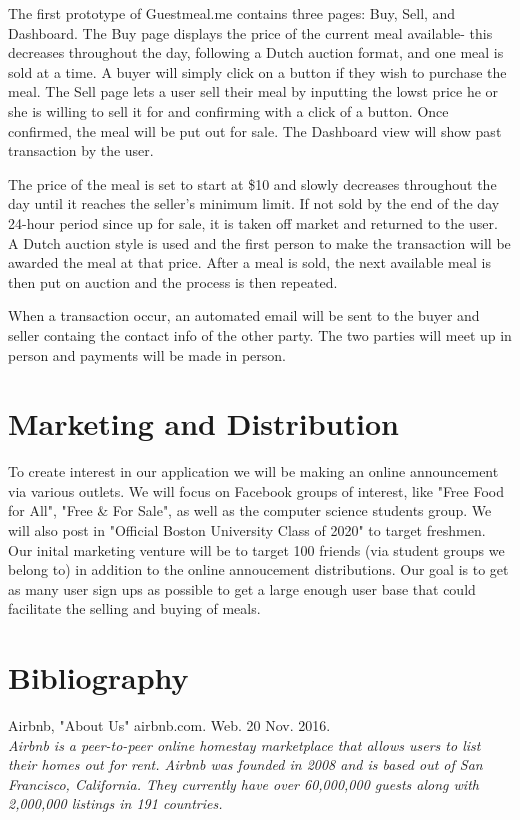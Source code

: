 \documentclass[column,12pt]{article}
\begin{document}
The first prototype of Guestmeal.me contains three pages: Buy, Sell, and Dashboard. The Buy page displays the price of the current meal available- this decreases throughout the day, following a Dutch auction format, and one meal is sold at a time. A buyer will simply click on a button if they wish to purchase the meal. The Sell page lets a user sell their meal by inputting the lowst price he or she is willing to sell it for and confirming with a click of a button. Once confirmed, the meal will be put out for sale. The Dashboard view will show past transaction by the user.

The price of the meal is set to start at \$10 and slowly decreases throughout the day until it reaches the seller's minimum limit. If not sold by the end of the day 24-hour period since up for sale, it is taken off market and returned to the user. A Dutch auction style is used and the first person to make the transaction will be awarded the meal at that price. After a meal is sold, the next available meal is then put on auction and the process is then repeated. 

When a transaction occur, an automated email will be sent to the buyer and seller containg the contact info of the other party. The two parties will meet up in person and payments will be made in person. 

\section{Marketing and Distribution}
To create interest in our application we will be making an online announcement via various outlets. We will focus on Facebook groups of interest, like "Free Food for All", "Free \& For Sale", as well as the computer science students group. We will also post in "Official Boston University Class of 2020" to target freshmen. Our inital marketing venture will be to target 100 friends (via student groups we belong to) in addition to the online annoucement distributions. Our goal is to get as many user sign ups as possible to get a large enough user base that could facilitate the selling and buying of meals. 

\section{Bibliography}
Airbnb, "About Us" airbnb.com. Web. 20 Nov. 2016. \\
 {\it Airbnb is a peer-to-peer online homestay marketplace that allows users to list their homes out for rent. Airbnb was founded in 2008 and is based out of San Francisco, California. They currently have over 60,000,000 guests along with 2,000,000 listings in 191 countries. }\\
\end{document}
